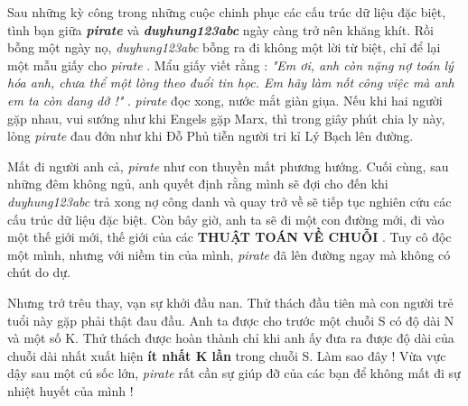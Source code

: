 Sau những kỳ công trong những cuộc chinh phục các cấu trúc dữ liệu đặc biệt, tình bạn giữa   \textbf{\emph{     pirate    }}   và   \textbf{\emph{     duyhung123abc    }}   ngày càng trở nên khăng khít. Rồi bỗng một ngày nọ,   \emph{    duyhung123abc   }   bỗng ra đi không một lời từ biệt, chỉ để lại một mẫu giấy cho   \emph{    pirate   }   . Mẩu giấy viết rằng :   \emph{    "Em ơi, anh còn nặng nợ toán lý hóa anh, chưa thể một lòng theo đuổi tin học. Em hãy làm nốt công việc mà anh em ta còn dang dở !"   }   .   \emph{    pirate   }   đọc xong, nước mắt giàn giụa. Nếu khi hai người gặp nhau, vui sướng như khi Engels gặp Marx, thì trong giây phút chia ly này, lòng   \emph{    pirate   }   đau đớn như khi Đỗ Phủ tiễn người tri kỉ Lý Bạch lên đường.  

   Mất đi người anh cả,   \emph{    pirate   }   như con thuyền mất phương hướng. Cuối cùng, sau những đêm không ngủ, anh quyết định rằng mình sẽ đợi cho đến khi   \emph{    duyhung123abc   }   trả xong nợ công danh và quay trở về sẽ tiếp tục nghiên cứu các cấu trúc dữ liệu đặc biệt. Còn bây giờ, anh ta sẽ đi một con đường mới, đi vào một thế giới mới, thế giới của các   \textbf{    THUẬT TOÁN VỀ CHUỖI   }   . Tuy cô độc một mình, nhưng với niềm tin của mình,   \emph{    pirate   }   đã lên đường ngay mà không có chút do dự.  

   Nhưng trớ trêu thay, vạn sự khởi đầu nan. Thử thách đầu tiên mà con người trẻ tuổi này gặp phải thật đau đầu. Anh ta được cho trước một chuỗi S có độ dài N và một số K. Thử thách được hoàn thành chỉ khi anh ấy đưa ra được độ dài của chuỗi dài nhất xuất hiện   \textbf{    ít nhất K lần   }   trong chuỗi S. Làm sao đây ! Vừa vực dậy sau một cú sốc lớn,   \emph{    pirate   }   rất cần sự giúp đỡ của các bạn để không mất đi sự nhiệt huyết của mình !  

\
